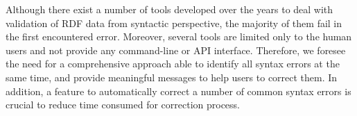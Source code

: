 Although there exist a number of tools developed over the years to deal with validation of RDF data from syntactic perspective, the majority of them fail in the first encountered error.
Moreover, several tools are limited only to the human users and not provide any command-line or API interface.
Therefore, we foresee the need for a comprehensive approach able to identify all syntax errors at the same time, and provide meaningful messages to help users to correct them.
In addition, a feature to automatically correct a number of common syntax errors is crucial to reduce time consumed for correction process.  











